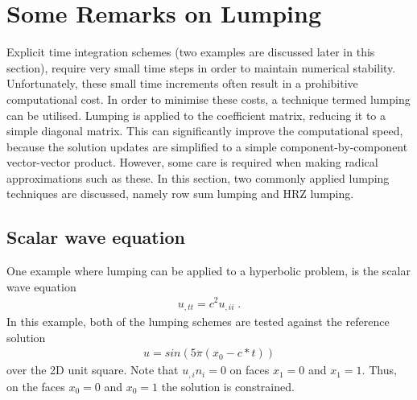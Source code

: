
%
%
%


\section{Some Remarks on Lumping}
\label{LUMPING}

Explicit time integration schemes (two examples are discussed later in this 
section), require very small time steps in order to maintain numerical stability. 
Unfortunately, these small time increments often result in a prohibitive 
computational cost. 
In order to minimise these costs, a technique termed lumping can be utilised.
Lumping is applied to the coefficient matrix, reducing it to a simple diagonal 
matrix. This can significantly improve the computational speed, because the 
solution updates are simplified to a simple component-by-component 
vector-vector product. However, some care is required when making radical
approximations such as these. In this section, two commonly applied lumping
techniques are discussed, namely row sum lumping 
and HRZ 
lumping.

\subsection{Scalar wave equation}
One example where lumping can be applied to a hyperbolic problem, is  
the scalar wave equation
\begin{eqnarray} \label{LUMPING WAVE} 
u_{,tt}=c^2 u_{,ii} \; .
\end{eqnarray}
In this example, both of the lumping schemes are tested against the reference solution
\begin{eqnarray} \label{LUMPING WAVE TEST} 
u=sin(5 \pi (x_0-c*t) )
\end{eqnarray}
over the 2D unit square. Note that $u_{,i}n_i=0$ on faces $x_1=0$ and $x_1=1$.
Thus, on the faces $x_0=0$ and $x_0=1$ the solution is constrained.


